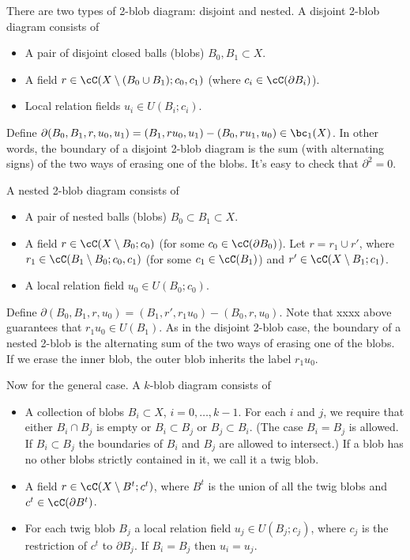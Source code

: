 \documentclass[11pt,leqno]{amsart}
\def\bd{\partial}
\def\sub{\subset}
\def\setmin{\setminus}
\begin{document}
There are two types of 2-blob diagram: disjoint and nested.
A disjoint 2-blob diagram consists of
\begin{itemize}
\item A pair of disjoint closed balls (blobs) $B_0, B_1 \sub X$.
\item A field $r \in \cC(X \setmin (B_0 \cup B_1); c_0, c_1)$
(where $c_i \in \cC(\bd B_i)$).
\item Local relation fields $u_i \in U(B_i; c_i)$.
\end{itemize}
Define $\bd(B_0, B_1, r, u_0, u_1) = (B_1, ru_0, u_1) - (B_0, ru_1, u_0) \in \bc_1(X)$.
In other words, the boundary of a disjoint 2-blob diagram
is the sum (with alternating signs)
of the two ways of erasing one of the blobs.
It's easy to check that $\bd^2 = 0$.

A nested 2-blob diagram consists of
\begin{itemize}
\item A pair of nested balls (blobs) $B_0 \sub B_1 \sub X$.
\item A field $r \in \cC(X \setmin B_0; c_0)$
(for some $c_0 \in \cC(\bd B_0)$).
Let $r = r_1 \cup r'$, where $r_1 \in \cC(B_1 \setmin B_0; c_0, c_1)$
(for some $c_1 \in \cC(B_1)$) and
$r' \in \cC(X \setmin B_1; c_1)$.
\item A local relation field $u_0 \in U(B_0; c_0)$.
\end{itemize}
Define $\bd(B_0, B_1, r, u_0) = (B_1, r', r_1u_0) - (B_0, r, u_0)$.
Note that xxxx above guarantees that $r_1u_0 \in U(B_1)$.
As in the disjoint 2-blob case, the boundary of a nested 2-blob is the alternating
sum of the two ways of erasing one of the blobs.
If we erase the inner blob, the outer blob inherits the label $r_1u_0$.

Now for the general case.
A $k$-blob diagram consists of
\begin{itemize}
\item A collection of blobs $B_i \sub X$, $i = 0, \ldots, k-1$.
For each $i$ and $j$, we require that either $B_i \cap B_j$ is empty or
$B_i \sub B_j$ or $B_j \sub B_i$.
(The case $B_i = B_j$ is allowed.
If $B_i \sub B_j$ the boundaries of $B_i$ and $B_j$ are allowed to intersect.)
If a blob has no other blobs strictly contained in it, we call it a twig blob.
\item A field $r \in \cC(X \setmin B^t; c^t)$,
where $B^t$ is the union of all the twig blobs and $c^t \in \cC(\bd B^t)$.
\item For each twig blob $B_j$ a local relation field $u_j \in U(B_j; c_j)$,
where $c_j$ is the restriction of $c^t$ to $\bd B_j$.
If $B_i = B_j$ then $u_i = u_j$.
\end{itemize}
\end{document}
